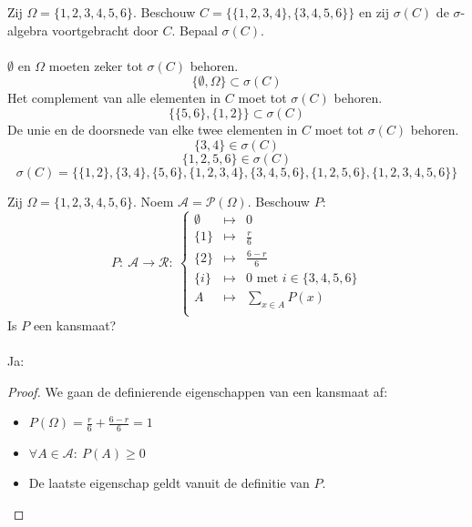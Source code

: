 \documentclass[main.tex]{subfiles}
\begin{document}
\begin{oef}
  Zij $\Omega = \{1,2,3,4,5,6\}$.
  Beschouw $C= \{\{1,2,3,4\},\{3,4,5,6\}\}$ en zij $\sigma(C)$ de $\sigma$-algebra voortgebracht door $C$.
  Bepaal $\sigma(C)$.\\\\
  $\emptyset$ en $\Omega$ moeten zeker tot $\sigma(C)$ behoren.
  \[ \{\emptyset, \Omega\} \subset \sigma(C)\]
  Het complement van alle elementen in $C$ moet tot $\sigma(C)$ behoren.
  \[ \{ \{5,6\},\{1,2\}\} \subset \sigma(C) \]
  De unie en de doorsnede van elke twee elementen in $C$ moet tot $\sigma(C)$ behoren.
  \[ \{3,4\} \in \sigma(C) \]
  \[ \{1,2,5,6\} \in \sigma(C) \]
  \[ \sigma(C) = \{ \{1,2\},\{3,4\},\{5,6\},\{1,2,3,4\},\{3,4,5,6\},\{1,2,5,6\},\{1,2,3,4,5,6\} \} \]
\end{oef}

\begin{oef}
  Zij $\Omega = \{1,2,3,4,5,6\}$.
  Noem $\mathcal{A} = \mathcal{P}(\Omega)$.
  Beschouw $P$:
  \[
  P:\ \mathcal{A} \rightarrow \mathcal{R}:\
  \left\{
    \begin{array}{rcl}
      \emptyset &\mapsto &0\\
      \{1\} &\mapsto &\frac{r}{6}\\
      \{2\} &\mapsto &\frac{6-r}{6}\\
      \{i\} &\mapsto & 0 \text{ met } i \in \{3,4,5,6\}\\
      A &\mapsto &\sum_{x \in A} P(x)\\
    \end{array}
  \right.
  \]
  Is $P$ een kansmaat?\\\\
  Ja:
  \begin{proof}
    We gaan de definierende eigenschappen van een kansmaat af:
    \begin{itemize}
    \item $P(\Omega) = \frac{r}{6} + \frac{6-r}{6} = 1$
    \item $\forall A \in \mathcal{A}:\ P(A) \ge 0$
    \item De laatste eigenschap geldt vanuit de definitie van $P$.
    \end{itemize}
  \end{proof}
\end{oef}
\end{document}
